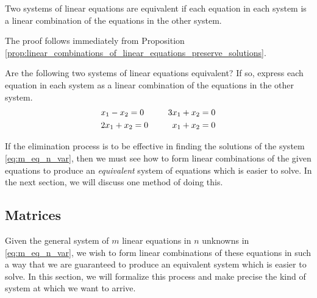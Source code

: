 \documentclass[12pt,letterpaper,reqno]{article}
\numberwithin{equation}{section}
\newcommand{\ti}[1]{\textit{#1}}
\begin{document}
\begin{prop}\label{prop:equivalent_linear_systems}
	Two systems of linear equations are equivalent if each equation in each system is a linear combination of the equations in the other system. 
\end{prop}

\begin{pf}
	The proof follows immediately from Proposition \ref{prop:linear_combinations_of_linear_equations_preserve_solutions}.
\end{pf}

\begin{exercise}
Are the following two systems of linear equations equivalent? If so, express each equation in each system as a linear combination of the equations in the other system.
\begin{align*}
	 x_1-x_2=0 \hspace{1.0cm} 3x_1+x_2&=0 \\
	2x_1+x_2=0 \hspace{1.0cm} x_1+x_2&=0
\end{align*}	
\end{exercise}

If the elimination process is to be effective in finding the solutions of the system \eqref{eq:m_eq_n_var}, then we must see how to form linear combinations of the given equations to produce an \ti{equivalent} system of equations which is easier to solve. In the next section, we will discuss one method of doing this.

\subsection{Matrices}
Given the general system of $m$ linear equations in $n$ unknowns in \eqref{eq:m_eq_n_var}, we wish to form linear combinations of these equations in such a way that we are guaranteed to produce an equivalent system which is easier to solve. In this section, we will formalize this process and make precise the kind of system at which we want to arrive.
\end{document}
